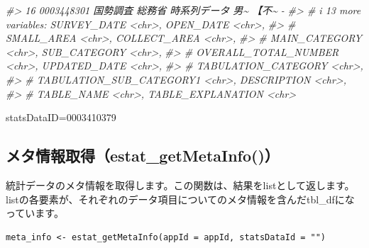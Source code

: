 \documentclass[
  xelatex, ja=standard]{bxjsbook}
\newenvironment{Shaded}{\begin{snugshade}}{\end{snugshade}}
\newcommand{\CommentTok}[1]{\textcolor[rgb]{0.56,0.35,0.01}{\textit{#1}}}
\theoremstyle{definition}
\theoremstyle{definition}
\theoremstyle{definition}
\theoremstyle{definition}
\theoremstyle{remark}
\begin{document}
\begin{Shaded}
\begin{Highlighting}[]
\CommentTok{\#\textgreater{} 16 0003448301 国勢調査  総務省  時系列データ 男\textasciitilde{} 【不\textasciitilde{} {-}    }
\CommentTok{\#\textgreater{} \# i 13 more variables: SURVEY\_DATE \textless{}chr\textgreater{}, OPEN\_DATE \textless{}chr\textgreater{},}
\CommentTok{\#\textgreater{} \#   SMALL\_AREA \textless{}chr\textgreater{}, COLLECT\_AREA \textless{}chr\textgreater{},}
\CommentTok{\#\textgreater{} \#   MAIN\_CATEGORY \textless{}chr\textgreater{}, SUB\_CATEGORY \textless{}chr\textgreater{},}
\CommentTok{\#\textgreater{} \#   OVERALL\_TOTAL\_NUMBER \textless{}chr\textgreater{}, UPDATED\_DATE \textless{}chr\textgreater{},}
\CommentTok{\#\textgreater{} \#   TABULATION\_CATEGORY \textless{}chr\textgreater{},}
\CommentTok{\#\textgreater{} \#   TABULATION\_SUB\_CATEGORY1 \textless{}chr\textgreater{}, DESCRIPTION \textless{}chr\textgreater{},}
\CommentTok{\#\textgreater{} \#   TABLE\_NAME \textless{}chr\textgreater{}, TABLE\_EXPLANATION \textless{}chr\textgreater{}}
\end{Highlighting}
\end{Shaded}

statsDataID=0003410379

\hypertarget{ux30e1ux30bfux60c5ux5831ux53d6ux5f97estat_getmetainfo}{%
\subsection{メタ情報取得（estat\_getMetaInfo()）}\label{ux30e1ux30bfux60c5ux5831ux53d6ux5f97estat_getmetainfo}}

統計データのメタ情報を取得します。この関数は、結果をlistとして返します。listの各要素が、それぞれのデータ項目についてのメタ情報を含んだtbl\_dfになっています。

\begin{verbatim}
meta_info <- estat_getMetaInfo(appId = appId, statsDataId = "")
\end{verbatim}
\end{document}

